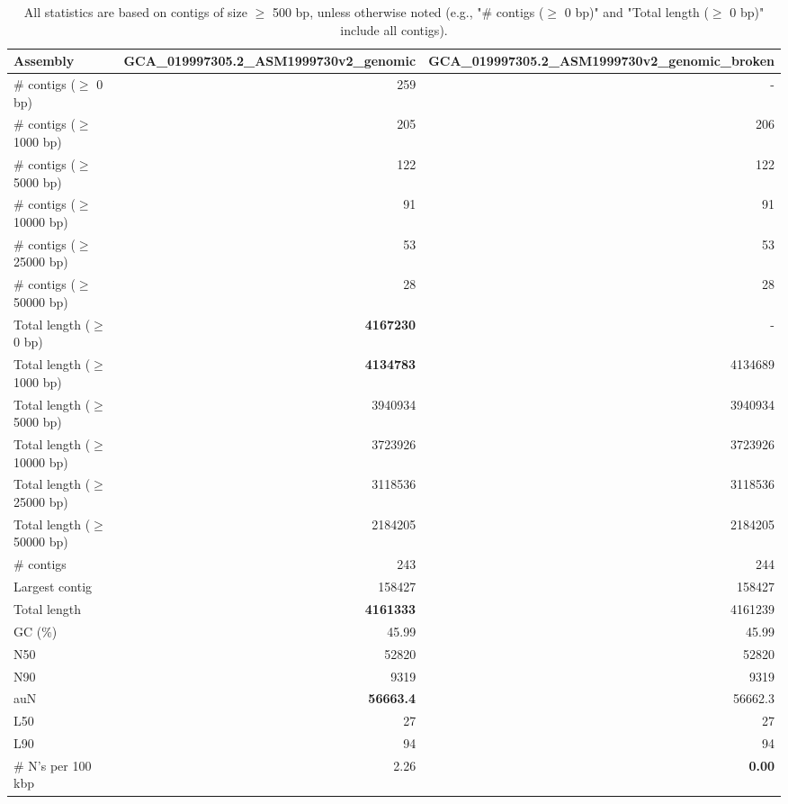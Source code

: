 \documentclass[12pt,a4paper]{article}
\begin{document}
\begin{table}[ht]
\begin{center}
\caption{All statistics are based on contigs of size $\geq$ 500 bp, unless otherwise noted (e.g., "\# contigs ($\geq$ 0 bp)" and "Total length ($\geq$ 0 bp)" include all contigs).}
\begin{tabular}{|l*{2}{|r}|}
\hline
Assembly & GCA\_019997305.2\_ASM1999730v2\_genomic & GCA\_019997305.2\_ASM1999730v2\_genomic\_broken \\ \hline
\# contigs ($\geq$ 0 bp) & 259 & - \\ \hline
\# contigs ($\geq$ 1000 bp) & 205 & 206 \\ \hline
\# contigs ($\geq$ 5000 bp) & 122 & 122 \\ \hline
\# contigs ($\geq$ 10000 bp) & 91 & 91 \\ \hline
\# contigs ($\geq$ 25000 bp) & 53 & 53 \\ \hline
\# contigs ($\geq$ 50000 bp) & 28 & 28 \\ \hline
Total length ($\geq$ 0 bp) & {\bf 4167230} & - \\ \hline
Total length ($\geq$ 1000 bp) & {\bf 4134783} & 4134689 \\ \hline
Total length ($\geq$ 5000 bp) & 3940934 & 3940934 \\ \hline
Total length ($\geq$ 10000 bp) & 3723926 & 3723926 \\ \hline
Total length ($\geq$ 25000 bp) & 3118536 & 3118536 \\ \hline
Total length ($\geq$ 50000 bp) & 2184205 & 2184205 \\ \hline
\# contigs & 243 & 244 \\ \hline
Largest contig & 158427 & 158427 \\ \hline
Total length & {\bf 4161333} & 4161239 \\ \hline
GC (\%) & 45.99 & 45.99 \\ \hline
N50 & 52820 & 52820 \\ \hline
N90 & 9319 & 9319 \\ \hline
auN & {\bf 56663.4} & 56662.3 \\ \hline
L50 & 27 & 27 \\ \hline
L90 & 94 & 94 \\ \hline
\# N's per 100 kbp & 2.26 & {\bf 0.00} \\ \hline
\end{tabular}
\end{center}
\end{table}
\end{document}
